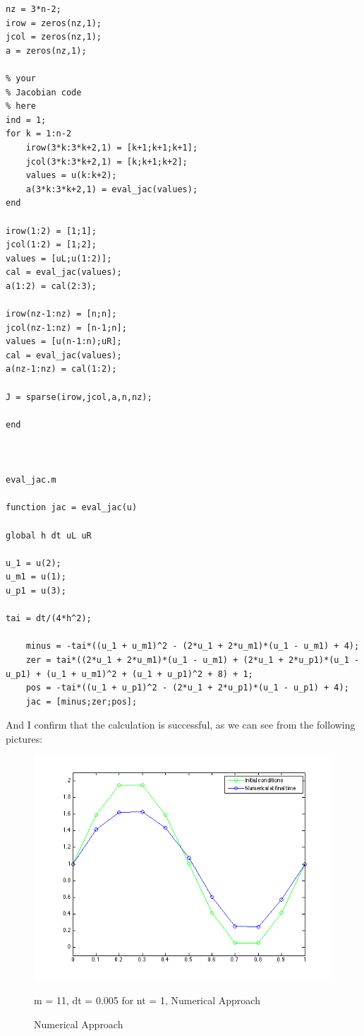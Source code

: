 \documentclass[11pt]{article}
\begin{document}
\begin{enumerate}
\begin{verbatim}
nz = 3*n-2;
irow = zeros(nz,1);
jcol = zeros(nz,1);
a = zeros(nz,1);

% your
% Jacobian code
% here
ind = 1;
for k = 1:n-2
    irow(3*k:3*k+2,1) = [k+1;k+1;k+1];
    jcol(3*k:3*k+2,1) = [k;k+1;k+2];
    values = u(k:k+2);
    a(3*k:3*k+2,1) = eval_jac(values);
end

irow(1:2) = [1;1];
jcol(1:2) = [1;2];
values = [uL;u(1:2)];
cal = eval_jac(values);
a(1:2) = cal(2:3);

irow(nz-1:nz) = [n;n];
jcol(nz-1:nz) = [n-1;n];
values = [u(n-1:n);uR];
cal = eval_jac(values);
a(nz-1:nz) = cal(1:2);
  
J = sparse(irow,jcol,a,n,nz);

end



eval_jac.m

function jac = eval_jac(u)

global h dt uL uR 

u_1 = u(2);
u_m1 = u(1);
u_p1 = u(3);

tai = dt/(4*h^2);

    minus = -tai*((u_1 + u_m1)^2 - (2*u_1 + 2*u_m1)*(u_1 - u_m1) + 4);
    zer = tai*((2*u_1 + 2*u_m1)*(u_1 - u_m1) + (2*u_1 + 2*u_p1)*(u_1 - u_p1) + (u_1 + u_m1)^2 + (u_1 + u_p1)^2 + 8) + 1;
    pos = -tai*((u_1 + u_p1)^2 - (2*u_1 + 2*u_p1)*(u_1 - u_p1) + 4);    
    jac = [minus;zer;pos];

\end{verbatim}

\FloatBarrier 
And I confirm that the calculation is successful, as we can see from the following pictures:
\begin{center}
\begin{figure}
\includegraphics[scale=0.6]{before_numerical.png}
    \caption{Numerical Approach}
    \begin{minipage}{0.75\textwidth}
    {\footnotesize m = 11, dt = 0.005 for nt = 1, Numerical Approach}
    \end{minipage}
    \end{figure}
    

\end{center}
\end{enumerate}
\end{document}
